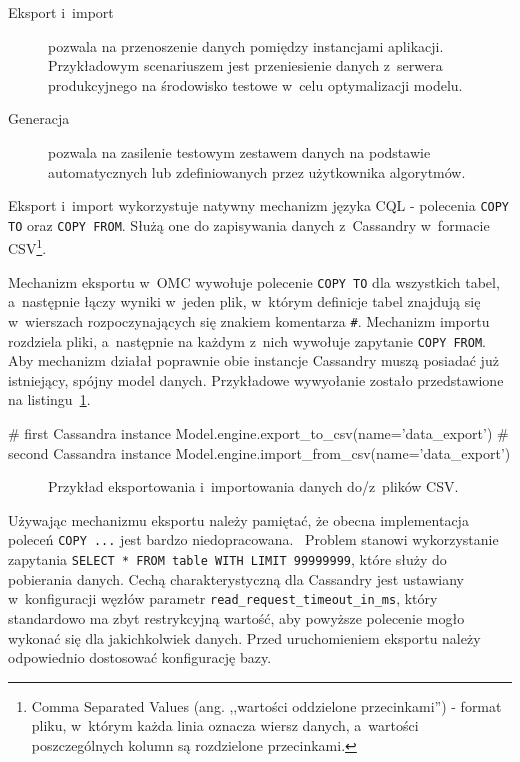 \begin{description}
	\item[Eksport i~import] pozwala na przenoszenie danych pomiędzy instancjami aplikacji. Przykładowym scenariuszem jest przeniesienie danych z~serwera produkcyjnego na środowisko testowe w~celu optymalizacji modelu.
	\item[Generacja] pozwala na zasilenie testowym zestawem danych na podstawie automatycznych lub zdefiniowanych przez użytkownika algorytmów.
\end{description}

Eksport i~import wykorzystuje natywny mechanizm języka CQL - polecenia \verb+COPY TO+ oraz \verb+COPY FROM+. Służą one do zapisywania danych z~Cassandry w~formacie CSV\footnote{Comma Separated Values (ang. ,,wartości oddzielone przecinkami'') - format pliku, w~którym każda linia oznacza wiersz danych, a~wartości poszczególnych kolumn są rozdzielone przecinkami.}. 

Mechanizm eksportu w~OMC wywołuje polecenie \verb+COPY TO+ dla wszystkich tabel, a~następnie łączy wyniki w~jeden plik, w~którym definicje tabel znajdują się w~wierszach rozpoczynających się znakiem komentarza \verb+#+. Mechanizm importu rozdziela pliki, a~następnie na każdym z~nich wywołuje zapytanie \verb+COPY FROM+. Aby mechanizm działał poprawnie obie instancje Cassandry muszą posiadać już istniejący, spójny model danych. Przykładowe wywyołanie zostało przedstawione na listingu~\ref{vrb:export_import_example}.

\begin{verbbox}[\footnotesize]
	# first Cassandra instance
	Model.engine.export_to_csv(name='data_export')
	# second Cassandra instance
	Model.engine.import_from_csv(name='data_export')
\end{verbbox}

\begin{figure}[ht!]
	\centering
	\theverbbox
	\caption{Przykład eksportowania i~importowania danych do/z~plików CSV.}
	\label{vrb:export_import_example}
\end{figure}

Używając mechanizmu eksportu należy pamiętać, że obecna implementacja poleceń \verb+COPY ...+ jest bardzo niedopracowana.~\cite{simple_data_importing_and_exporting} Problem stanowi wykorzystanie zapytania \verb+SELECT * FROM table WITH LIMIT 99999999+, które służy do pobierania danych. Cechą charakterystyczną dla Cassandry jest ustawiany w~konfiguracji węzłów parametr \verb+read_request_timeout_in_ms+, który standardowo ma zbyt restrykcyjną wartość, aby powyższe polecenie mogło wykonać się dla jakichkolwiek danych. Przed uruchomieniem eksportu należy odpowiednio dostosować konfigurację bazy.

